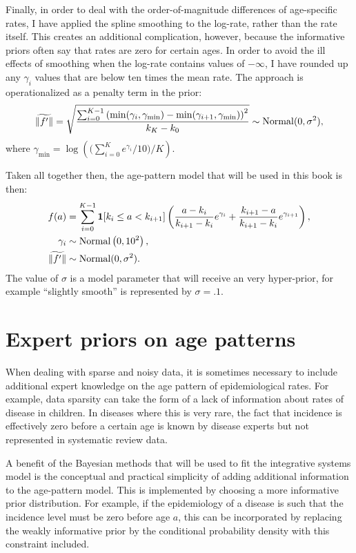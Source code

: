 Finally, in order to deal with the order-of-magnitude differences of
age-specific rates, I have applied the spline smoothing to the
log-rate, rather than the rate itself.  This creates an additional
complication, however, because the informative priors often say that
rates are zero for certain ages.  In order to avoid the ill effects of
smoothing when the log-rate contains values of $-\infty$, I have
rounded up any $\gamma_i$ values that are below ten times the mean
rate.  The approach is operationalized as a penalty term in the prior:
\[
\widetilde{\|f'\|} = \sqrt{\frac{\sum_{i=0}^{K-1} 
\left(\min(\gamma_i, \gamma_{\min})
-
\min(\gamma_{i+1}, \gamma_{\min})\right)^2
}{k_K-k_0} } \sim \operatorname{Normal}(0, \sigma^2),
\]
where $\gamma_{\min} = \log\left(\bigg(\sum_{i=0}^K e^{\gamma_i}/10\bigg)
/ K\right)$.


Taken all together then, the age-pattern model that will be used in this
book is then:
\begin{align*}
f(a) &= \sum_{i=0}^{K-1} \mathbf{1}[k_i \leq a < k_{i+1}]\left( \frac{a-k_i}{k_{i+1}-k_i} e^{\gamma_i} + \frac{k_{i+1}-a}{k_{i+1}-k_i} e^{\gamma_{i+1}}\right),\\
\gamma_i &\sim \operatorname{Normal}\left(0, 10^2\right),\\
\widetilde{\|f'\|} &\sim \operatorname{Normal}(0, \sigma^2).\\
\end{align*}
The value of $\sigma$ is a model parameter that will
receive an very hyper-prior, for example ``slightly smooth'' is represented by $\sigma=.1$.




\chapter{Expert priors on age patterns}

When dealing with sparse and noisy data, it is sometimes necessary to
include additional expert knowledge on the age pattern of
epidemiological rates.  For example, data sparsity can take the form
of a lack of information about rates of disease in children.  In
diseases where this is very rare, the fact that incidence is
effectively zero before a certain age is known by disease experts but
not represented in systematic review data.

A benefit of the Bayesian methods that will be used to fit the
integrative systems model is the conceptual and practical simplicity
of adding additional information to the age-pattern model.  This is
implemented by choosing a more informative prior distribution.  For
example, if the epidemiology of a disease is such that the incidence
level must be zero before age $a$, this can be incorporated by
replacing the weakly informative prior by the conditional probability
density with this constraint included.

